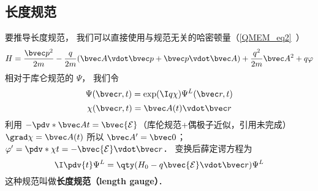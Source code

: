 \subsection{长度规范}
要推导长度规范， 我们可以直接使用与规范无关的哈密顿量（\autoref{QMEM_eq2}~）
\begin{equation}
H = \frac{\bvec p^2}{2m} - \frac{q}{2m} (\bvec A \vdot \bvec p + \bvec p \vdot \bvec A)
+ \frac{q^2}{2m} \bvec A^2 + q \varphi
\end{equation}
相对于库仑规范的 $\Psi$， 我们令
\begin{equation}
\Psi(\bvec r, t) = \exp(\I q\chi)\Psi^L(\bvec r, t)
\end{equation}
\begin{equation}
\chi(\bvec r, t) = \bvec A(t) \vdot \bvec r
\end{equation}
利用 $-\pdv*{\bvec A}{t} = \bvec {\mathcal E}$（库伦规范+偶极子近似，引用未完成） $\grad \chi = \bvec A(t)$ 所以 $\bvec A' = \bvec 0$； $\varphi' = \pdv*{\chi}{t} = -\bvec {\mathcal E} \vdot \bvec r$． 变换后薛定谔方程为
\begin{equation}
\I \pdv{t} \Psi^L = \qty(H_0 - q\bvec{\mathcal{E}} \vdot \bvec r) \Psi^L
\end{equation}
这种规范叫做\textbf{长度规范（length gauge）}．
